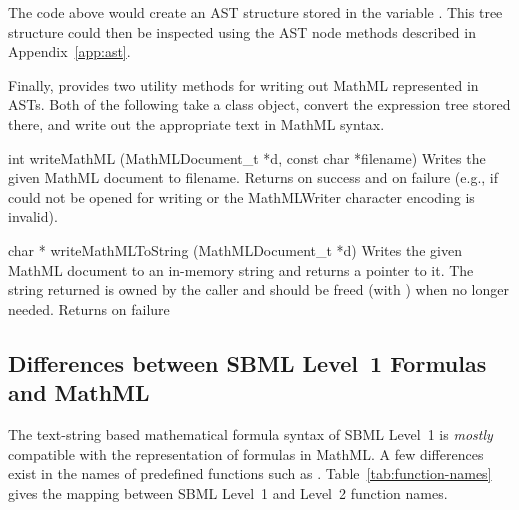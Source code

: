 \documentclass{sbmlmanual}
\begin{document}
The code above would create an AST structure stored in the variable
.  This tree structure could then be inspected using the AST node
methods described in Appendix~\ref{app:ast}.

Finally, \libsbml{} provides two utility methods for writing out MathML
represented in ASTs.  Both of the following take a
 class object, convert the expression tree stored
there, and write out the appropriate text in MathML syntax.


\begin{methoddef}{int writeMathML (MathMLDocument\_t *d, const char *filename)}
  Writes the given MathML document to filename.  Returns  on
  success and  on failure (e.g., if  could not
  be opened for writing or the MathMLWriter character encoding is invalid).
\end{methoddef}


\begin{methoddef}{char * writeMathMLToString (MathMLDocument\_t *d)}
  Writes the given MathML document to an in-memory string and returns a
  pointer to it.  The string returned is owned by the caller and should be
  freed (with ) when no longer needed.  Returns  on
  failure
\end{methoddef}



\subsection{Differences between SBML Level~1 Formulas and MathML}
\label{sec:function-names}

The text-string based mathematical formula syntax of SBML Level~1 is
\emph{mostly} compatible with the representation of formulas in MathML.  A
few differences exist in the names of predefined functions such as
.  Table~\vref{tab:function-names} gives the mapping
between SBML Level~1 and Level~2 function names.  
\end{document}
